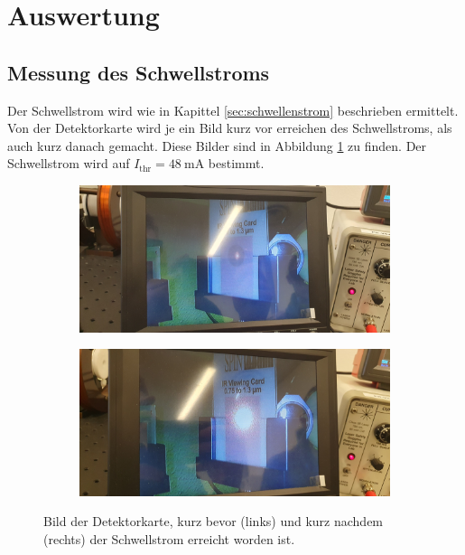 \newpage
\section{Auswertung}
\label{sec:Auswertung}

\subsection{Messung des Schwellstroms}
\label{sec:schwellstrom}

Der Schwellstrom wird wie in Kapittel \ref{sec:schwellenstrom} beschrieben ermittelt. 
Von der Detektorkarte wird je ein Bild kurz vor erreichen des Schwellstroms, als auch kurz danach gemacht.
Diese Bilder sind in Abbildung  \ref{fig:1} zu finden.
Der Schwellstrom wird auf $I_{\text{thr}} = \SI{48}{\milli\ampere}$ bestimmt.

\begin{figure}
    \centering
    \begin{subfigure}[b]{0.49\textwidth}
        \centering
        \includegraphics[width= \textwidth]{plots/Schwellstrom_1.jpg}
    \end{subfigure}
    \hfill
    \begin{subfigure}[b]{0.49\textwidth}
        \centering
        \includegraphics[width= \textwidth]{plots/Schwellstrom_2.jpg}
    \end{subfigure}
    \caption{Bild der Detektorkarte, kurz bevor (links) und kurz nachdem (rechts) der Schwellstrom erreicht worden ist.}
    \label{fig:1}
\end{figure}


